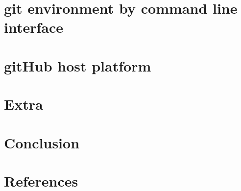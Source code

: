 \documentclass{beamer}
\begin{document}
\section{git environment by command line interface}


\section{gitHub host platform}
%

\section{Extra}
%

\section{Conclusion}
%

\section{References}

\end{document}
